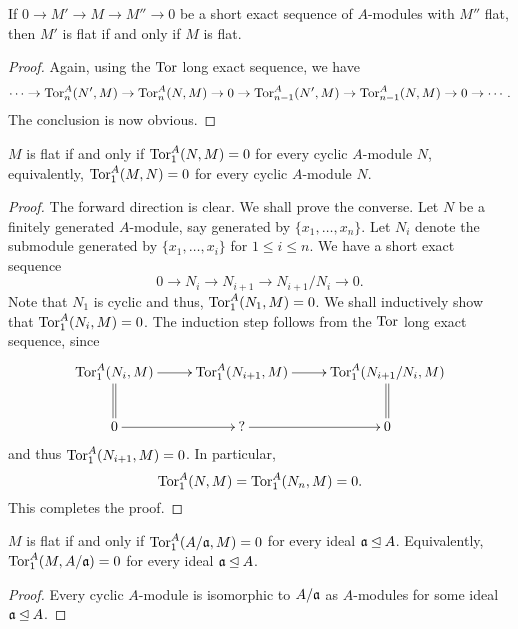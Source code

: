 \begin{lemma}
    If $0\to M'\to M\to M''\to 0$ be a short exact sequence of $A$-modules with $M''$ flat, then $M'$ is flat if and only if $M$ is flat.
\end{lemma}
\begin{proof}
    Again, using the $\operatorname{Tor}$ long exact sequence, we have 
    \begin{equation*}
        \cdots\to\operatorname{Tor}_n^A(N', M)\to\operatorname{Tor}_n^A(N, M)\to 0\to\operatorname{Tor}_{n - 1}^A(N', M)\to\operatorname{Tor}_{n - 1}^A(N, M)\to 0\to\cdots.
    \end{equation*}
    The conclusion is now obvious.
\end{proof}

\begin{lemma}
    $M$ is flat if and only if $\operatorname{Tor}_1^A(N, M) = 0$ for every cyclic $A$-module $N$, equivalently, $\operatorname{Tor}^A_1(M, N) = 0$ for every cyclic $A$-module $N$.
\end{lemma}
\begin{proof}
    The forward direction is clear. We shall prove the converse. Let $N$ be a finitely generated $A$-module, say generated by $\{x_1,\dots,x_n\}$. Let $N_i$ denote the submodule generated by $\{x_1,\dots, x_i\}$ for $1\le i\le n$. We have a short exact sequence 
    \begin{equation*}
        0\longrightarrow N_i\longrightarrow N_{i + 1}\longrightarrow N_{i + 1}/N_i\longrightarrow 0.
    \end{equation*}
    Note that $N_1$ is cyclic and thus, $\operatorname{Tor}^A_1(N_1, M) = 0$. We shall inductively show that $\operatorname{Tor}^A_1(N_i, M) = 0$. The induction step follows from the $\operatorname{Tor}$ long exact sequence, since 
    \begin{equation*}
        \xymatrix {
            \Tor^A_1(N_i, M)\ar[r]\ar@{=}[d] & \Tor^A_1(N_{i + 1}, M)\ar[r] & \Tor^A_1(N_{i + 1}/N_i, M)\ar@{=}[d]\\
            0\ar[r] & ?\ar[r] & 0
        }
    \end{equation*}
    and thus $\operatorname{Tor}^A_1(N_{i + 1}, M) = 0$. In particular,
    \begin{equation*}
        \operatorname{Tor}^A_1(N, M) = \operatorname{Tor}^A_1(N_n, M) = 0.
    \end{equation*}
    This completes the proof.
\end{proof}
\begin{corollary}
    $M$ is flat if and only if $\operatorname{Tor}^A_1(A/\mathfrak a, M) = 0$ for every ideal $\mathfrak a\unlhd A$. Equivalently, $\operatorname{Tor}^A_1(M,A/\mathfrak a) = 0$ for every ideal $\mathfrak a\unlhd A$.
\end{corollary}
\begin{proof}
    Every cyclic $A$-module is isomorphic to $A/\mathfrak a$ as $A$-modules for some ideal $\mathfrak a\unlhd A$.
\end{proof}

